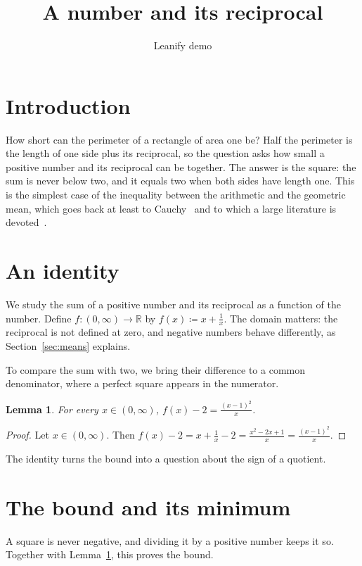 \documentclass{article}
\title{A number and its reciprocal}
\author{Leanify demo}
\newtheorem{lemma}{Lemma}[section]
\begin{document}
\maketitle

\section{Introduction}\label{sec:intro}

How short can the perimeter of a rectangle of area one be?
Half the perimeter is the length of one side plus its reciprocal, so the question asks how small a positive number and its reciprocal can be together.
The answer is the square: the sum is never below two, and it equals two when both sides have length one.
This is the simplest case of the inequality between the arithmetic and the geometric mean, which goes back at least to Cauchy~\cite{cauchy1821} and to which a large literature is devoted~\cite{bullen2003,hardy1952}.

\section{An identity}\label{sec:identity}

We study the sum of a positive number and its reciprocal as a function of the number.
Define $f:(0,\infty)\to\mathbb{R}$ by $f(x)\coloneqq x+\frac1x$.
The domain matters: the reciprocal is not defined at zero, and negative numbers behave differently, as Section~\ref{sec:means} explains.

To compare the sum with two, we bring their difference to a common denominator, where a perfect square appears in the numerator.

\begin{lemma}\label{lem:identity}
For every $x\in(0,\infty)$, $f(x)-2=\frac{(x-1)^2}{x}$.
\end{lemma}

\begin{proof}
Let $x\in(0,\infty)$.
Then $f(x)-2=x+\frac1x-2=\frac{x^2-2x+1}{x}=\frac{(x-1)^2}{x}$.
\end{proof}

The identity turns the bound into a question about the sign of a quotient.

\section{The bound and its minimum}\label{sec:bound}

A square is never negative, and dividing it by a positive number keeps it so.
Together with Lemma~\ref{lem:identity}, this proves the bound.
\end{document}
